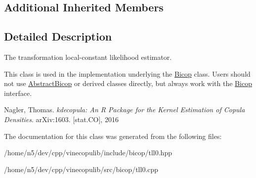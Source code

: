 \subsection*{Additional Inherited Members}


\subsection{Detailed Description}
The transformation local-\/constant likelihood estimator. 

This class is used in the implementation underlying the \hyperlink{classvinecopulib_1_1_bicop}{Bicop} class. Users should not use \hyperlink{classvinecopulib_1_1_abstract_bicop}{Abstract\+Bicop} or derived classes directly, but always work with the \hyperlink{classvinecopulib_1_1_bicop}{Bicop} interface.

Nagler, Thomas. {\itshape kdecopula\+: An R Package for the Kernel Estimation of Copula Densities}. ar\+Xiv\+:1603. \mbox{[}stat.\+CO\mbox{]}, 2016 

The documentation for this class was generated from the following files\+:\begin{DoxyCompactItemize}
\item 
/home/n5/dev/cpp/vinecopulib/include/bicop/tll0.\+hpp\item 
/home/n5/dev/cpp/vinecopulib/src/bicop/tll0.\+cpp\end{DoxyCompactItemize}
